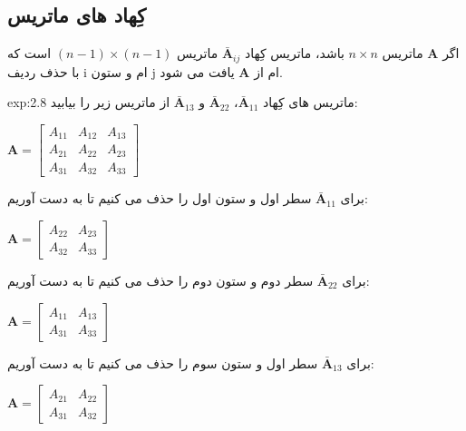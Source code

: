 \subsection{\textbf{کِهاد های ماتریس}}
\label{subsec:2.5.1}
{
    \Large
    \begin{spacing}{1.3}
        اگر $\textbf{A}$ ماتریس $n\times n$ باشد، ماتریس کِهاد $\bar{\textbf{A}}_{ij}$ ماتریس $(n-1)\times (n-1)$ است که با حذف ردیف i ام و ستون j ام از $\textbf{A}$ یافت می شود.

        \begin{example}{exp:2.8}
            \Large
            ماتریس های کِهاد $\bar{\textbf{A}}_{11}$، $\bar{\textbf{A}}_{22}$ و $\bar{\textbf{A}}_{13}$ از ماتریس زیر را بیابید:

            \begin{center}
                $\textbf{A}=\begin{bmatrix}
                                A_{11} & A_{12} & A_{13} \\
                                A_{21} & A_{22} & A_{23} \\
                                A_{31} & A_{32} & A_{33}
                \end{bmatrix}$
            \end{center}

            برای $\bar{\textbf{A}}_{11}$ سطر اول و ستون اول را حذف می کنیم تا به دست آوریم:

            \begin{center}
                $\textbf{A}=\begin{bmatrix}
                                A_{22} & A_{23} \\
                                A_{32} & A_{33}
                \end{bmatrix}$
            \end{center}

            برای $\bar{\textbf{A}}_{22}$ سطر دوم و ستون دوم را حذف می کنیم تا به دست آوریم:

            \begin{center}
                $\textbf{A}=\begin{bmatrix}
                                A_{11} & A_{13} \\
                                A_{31} & A_{33}
                \end{bmatrix}$
            \end{center}

            برای $\bar{\textbf{A}}_{13}$ سطر اول و ستون سوم را حذف می کنیم تا به دست آوریم:

            \begin{center}
                $\textbf{A}=\begin{bmatrix}
                                A_{21} & A_{22} \\
                                A_{31} & A_{32}
                \end{bmatrix}$
            \end{center}
        \end{example}
    \end{spacing}
}
